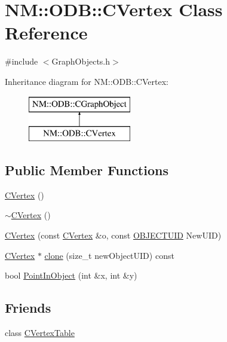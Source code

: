 \hypertarget{class_n_m_1_1_o_d_b_1_1_c_vertex}{}\section{N\+M\+:\+:O\+D\+B\+:\+:C\+Vertex Class Reference}
\label{class_n_m_1_1_o_d_b_1_1_c_vertex}


{\ttfamily \#include $<$Graph\+Objects.\+h$>$}

Inheritance diagram for N\+M\+:\+:O\+D\+B\+:\+:C\+Vertex\+:\begin{figure}[H]
\begin{center}
\leavevmode
\includegraphics[height=2.000000cm]{class_n_m_1_1_o_d_b_1_1_c_vertex}
\end{center}
\end{figure}
\subsection*{Public Member Functions}
\begin{DoxyCompactItemize}
\item 
\hyperlink{class_n_m_1_1_o_d_b_1_1_c_vertex_a5e8a4fe9fda6040c0c0f28daf05bb03b}{C\+Vertex} ()
\item 
\hyperlink{class_n_m_1_1_o_d_b_1_1_c_vertex_a8e26e972a1324064e6706809ebf81377}{$\sim$\+C\+Vertex} ()
\item 
\hyperlink{class_n_m_1_1_o_d_b_1_1_c_vertex_aaa42a4697d7ad41b6f20f16a9fb96170}{C\+Vertex} (const \hyperlink{class_n_m_1_1_o_d_b_1_1_c_vertex}{C\+Vertex} \&o, const \hyperlink{namespace_n_m_1_1_o_d_b_a262b64fab56baaa96e18bac4ada88265}{O\+B\+J\+E\+C\+T\+U\+I\+D} New\+U\+I\+D)
\item 
\hyperlink{class_n_m_1_1_o_d_b_1_1_c_vertex}{C\+Vertex} $\ast$ \hyperlink{class_n_m_1_1_o_d_b_1_1_c_vertex_afe1a131c1b47dc9953e5d164a380af68}{clone} (size\+\_\+t new\+Object\+U\+I\+D) const 
\item 
bool \hyperlink{class_n_m_1_1_o_d_b_1_1_c_vertex_a5969c889748b2713e0b1742a136cdf05}{Point\+In\+Object} (int \&x, int \&y)
\end{DoxyCompactItemize}
\subsection*{Friends}
\begin{DoxyCompactItemize}
\item 
class \hyperlink{class_n_m_1_1_o_d_b_1_1_c_vertex_a1d86cbedc9bc2eb368c4ef78ee139e3d}{C\+Vertex\+Table}
\end{DoxyCompactItemize}
